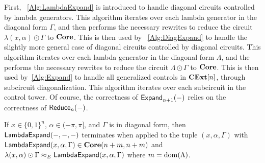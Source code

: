 First, ~\cref{Alg:LambdaExpand} is introduced to handle diagonal circuits controlled by lambda generators.
This algorithm iterates over each lambda generator in the diagonal form $\Gamma$, and then performs the necessary rewrites to reduce the circuit $\lambda( x, \alpha ) \odot \Gamma$ to $\mathbf{Core}$.
This is then used by ~\cref{Alg:DiagExpand} to handle the slightly more general case of diagonal circuits controlled by diagonal circuits.
This algorithm iterates over each lambda generator in the diagonal form $\Lambda$, and the performs the necessary rewrites to reduce the circuit $\Lambda \odot \Gamma$ to $\mathbf{Core}$.
This is then used by~\cref{Alg:Expand} to handle all generalized controls in $\mathbf{CExt}[n]$, through subcircuit diagonalization.
This algorithm iterates over each subcircuit in the control tower.
Of course, the correctness of $\mathsf{Expand}_{n+1}( - )$ relies on the correctness of $\mathsf{Reduce}_n( - )$.

\begin{lemma}
    \label{Lem:LambdaExpand}
    If $x \in \{ 0, 1 \}^n$, $\alpha \in (-\pi, \pi]$, and $\Gamma$ is in diagonal form, then $\mathsf{LambdaExpand}( -, -, - )$ terminates when applied to the tuple $( x, \alpha, \Gamma )$ with $\mathsf{LambdaExpand}( x, \alpha, \Gamma ) \in \mathbf{Core}( n + m, n + m )$ and $\lambda( x, \alpha ) \odot \Gamma \approx_E \mathsf{LambdaExpand}( x, \alpha, \Gamma )$ where $m = \operatorname{dom}( \Lambda )$.
\end{lemma}

